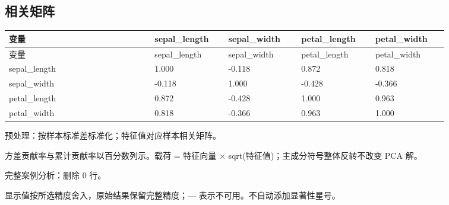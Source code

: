 \documentclass[UTF8]{ctexart}
\begin{document}
\subsection*{相关矩阵}
\small
\setlength{\tabcolsep}{2pt}
\begin{longtable}{p{0.2867\linewidth}p{0.1433\linewidth}p{0.1433\linewidth}p{0.1433\linewidth}p{0.1433\linewidth}}
\toprule
变量 & sepal\_length & sepal\_width & petal\_length & petal\_width \\
\midrule
\endfirsthead
\toprule
变量 & sepal\_length & sepal\_width & petal\_length & petal\_width \\
\midrule
\endhead
sepal\_length & 1.000 & -0.118 & 0.872 & 0.818 \\
sepal\_width & -0.118 & 1.000 & -0.428 & -0.366 \\
petal\_length & 0.872 & -0.428 & 1.000 & 0.963 \\
petal\_width & 0.818 & -0.366 & 0.963 & 1.000 \\
\bottomrule
\end{longtable}
\noindent 预处理：按样本标准差标准化；特征值对应样本相关矩阵。\par
\noindent 方差贡献率与累计贡献率以百分数列示。载荷 = 特征向量 × sqrt(特征值)；主成分符号整体反转不改变 PCA 解。\par
\noindent 完整案例分析：删除 0 行。\par
\noindent 显示值按所选精度舍入，原始结果保留完整精度；— 表示不可用。不自动添加显著性星号。\par
\end{document}
